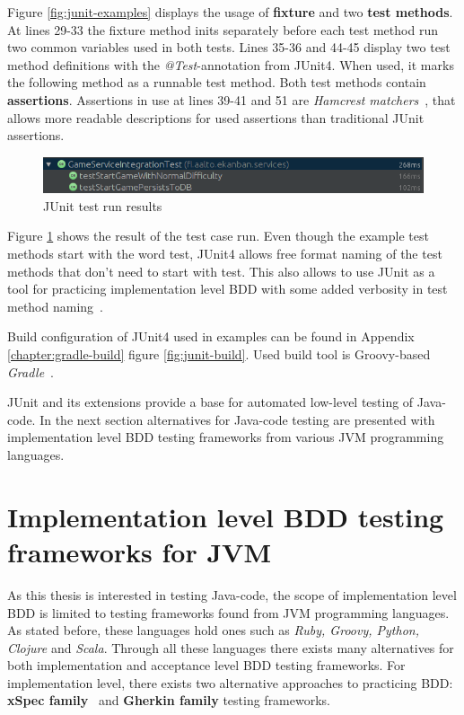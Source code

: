     Figure \ref{fig:junit-examples} displays the usage of \textbf{fixture} and two \textbf{test methods}. At lines 29-33 the fixture method
    inits separately before each test method run two common variables used in both tests. Lines 35-36 and 44-45 display two test method definitions with the
    \textit{@Test}-annotation from JUnit4. When used, it marks the following method as a runnable test method. Both test methods
    contain \textbf{assertions}. Assertions in use at lines 39-41 and 51 are \textit{Hamcrest matchers}~\cite{hamcrest}, that
    allows more readable descriptions for used assertions than traditional JUnit assertions.

    \begin{figure}[ht]
      \begin{center}
        \includegraphics[width=12.5cm]{images/junit-result.png}
        \caption{JUnit test run results}
        \label{fig:junit-result}
      \end{center}
    \end{figure}

    Figure \ref{fig:junit-result} shows the result of the test case run. Even though the example test methods start with the word test,
    JUnit4 allows free format naming of the test methods that don't need to start with test. This also allows to use JUnit as a tool for practicing
    implementation level BDD with some added verbosity in test method naming~\cite{smart2014bdd}.

    Build configuration of JUnit4 used in examples can be found in Appendix \ref{chapter:gradle-build} figure \ref{fig:junit-build}.
    Used build tool is Groovy-based \textit{Gradle}~\cite{gradle}.

    JUnit and its extensions provide a base for automated low-level testing of Java-code.
    In the next section alternatives for Java-code testing are presented with implementation level BDD testing frameworks from
    various JVM programming languages.

\section{Implementation level BDD testing frameworks for JVM}
    As this thesis is interested in testing Java-code, the scope of implementation level BDD is limited to testing frameworks
    found from JVM programming languages. As stated before, these languages hold ones such as \textit{Ruby, Groovy, Python,
    Clojure} and \textit{Scala}. Through all these languages there exists many alternatives for both implementation and
    acceptance level BDD testing frameworks. For implementation level, there exists two alternative approaches to practicing
    BDD: \textbf{xSpec family}~\cite{solis2011study} and \textbf{Gherkin family} testing frameworks.

